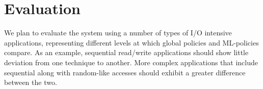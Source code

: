 \section{Evaluation}

We plan to evaluate the system using a number of types of I/O intensive
applications, representing different levels at which global policies and
ML-policies compare.  As an example, sequential read/write applications should
show little deviation from one technique to another.  More complex applications
that include sequential along with random-like accesses should exhibit a
greater difference between the two.
